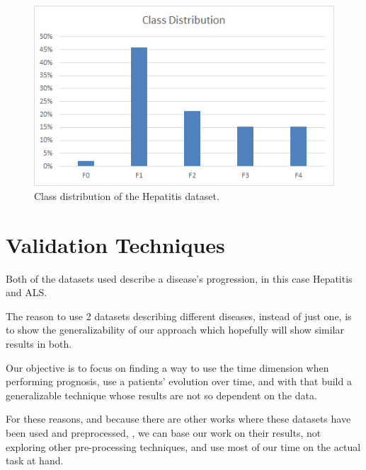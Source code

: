    \begin{figure}[h]
   	\centering
   	\includegraphics[width=0.49\linewidth]{Figures/class_distribution_hep.png}
   	\caption{Class distribution of the Hepatitis dataset.}
   	\label{fig:hep_distribution}
   \end{figure}




 \section{Validation Techniques}
\label{section:validation}

Both of the datasets used describe a disease’s progression, in this case Hepatitis and ALS. 

The reason to use 2 datasets describing different diseases, instead of just one, is to show the generalizability of our approach which hopefully
will show similar results in both.

Our objective is to focus on finding a way to use the time dimension when performing prognosis, use a patients’ evolution over time, and with
that build a generalizable technique whose results are not so dependent on the data.

For these reasons, and because there are other works where these datasets have been used and preprocessed, \cite{Watanabe2003}, we can base our work on their results, not exploring other pre-processing techniques, and use most of our time on the actual task at hand.

